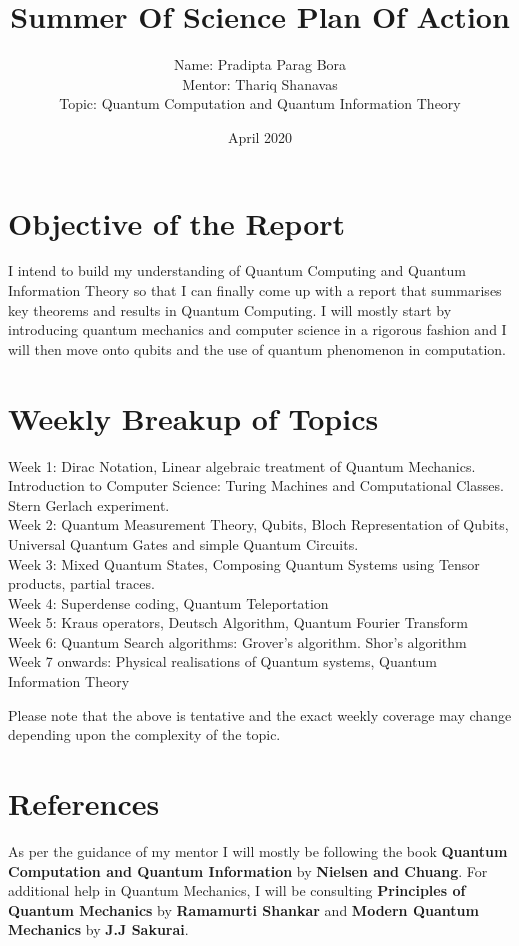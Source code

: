 \documentclass{article}
\title{Summer Of Science Plan Of Action }
\author{Name: Pradipta Parag Bora \\ Mentor: Thariq Shanavas \\ Topic: Quantum Computation and Quantum Information Theory}
\date{April 2020}
\begin{document}
\maketitle
\section{Objective of the Report}
I intend to build my understanding of Quantum Computing and Quantum Information Theory so that I can finally come up with a report that summarises key theorems and results in Quantum Computing. I will mostly start by introducing quantum mechanics and computer science in a rigorous fashion and I will then move onto qubits and the use of quantum phenomenon in computation.
\section{Weekly Breakup of Topics}

Week 1: Dirac Notation, Linear algebraic treatment of Quantum Mechanics.  Introduction to Computer Science: Turing Machines and Computational Classes. Stern Gerlach experiment. \\
Week 2: Quantum Measurement Theory, Qubits, Bloch Representation of Qubits, Universal Quantum Gates and simple Quantum Circuits. \\
Week 3: Mixed Quantum States, Composing Quantum Systems using Tensor products, partial traces. \\
Week 4: Superdense coding, Quantum Teleportation \\ 
Week 5: Kraus operators, Deutsch Algorithm, Quantum Fourier Transform \\
Week 6: Quantum Search algorithms: Grover's algorithm. Shor's algorithm \\
Week 7 onwards: Physical realisations of Quantum systems, Quantum Information Theory

Please note that the above is tentative and the exact weekly coverage may change depending upon the complexity of the topic.

\section{References}
As per the guidance of my mentor I will mostly be following the book \textbf{Quantum Computation and Quantum Information} by \textbf{Nielsen and Chuang}.
For additional help in Quantum Mechanics, I will be consulting \textbf{Principles of Quantum Mechanics} by \textbf{Ramamurti Shankar} and \textbf{Modern Quantum Mechanics} by \textbf{J.J Sakurai}.
\end{document}
